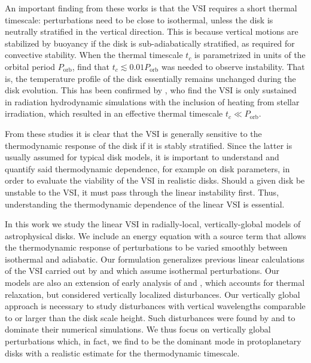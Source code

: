\documentclass[iop]{emulateapj}
\begin{document}
An important finding from these works is that the VSI requires a short
thermal timescale: perturbations need to be close to
isothermal, unless the disk is neutrally stratified in the vertical
direction. This is because vertical motions are stabilized by
buoyancy if the disk is sub-adiabatically stratified, as required for
convective stability. When the thermal timescale $t_c$ is parametrized
in units of the orbital period $P_\mathrm{orb}$, \cite{nelson13} find that
$t_c\lesssim 0.01P_\mathrm{orb}$ was needed to observe instability. That is, the
temperature profile of the disk essentially remains unchanged during
the disk evolution. This has been confirmed by 
\cite{stoll14}, who find the VSI is only sustained in radiation
hydrodynamic simulations with the inclusion of heating from stellar
irradiation, which resulted in an effective thermal timescale $t_c\ll
P_\mathrm{orb}$. 


From these studies it is clear that the VSI is generally sensitive to
the thermodynamic response of the disk if it is stably
stratified. Since the latter is usually assumed for typical disk
models,  
it is 
important to understand and quantify said thermodynamic dependence,
for example on disk parameters, in order to evaluate the viability of
the VSI in realistic disks. %
Should a given disk be unstable to the VSI, it must pass through the
linear instability first. Thus, understanding the thermodynamic dependence
of the linear VSI is essential. %

In this work we study the linear VSI in radially-local,
vertically-global models of astrophysical disks. We include an energy
equation with a source term that allows the thermodynamic response of
perturbations to be varied smoothly between isothermal and adiabatic. Our
formulation generalizes previous linear calculations of the 
VSI carried out by \cite{nelson13} and \cite{mcnally14} which assume
isothermal perturbations. Our models are also an extension of early
analysis of \cite{urpin98} and \cite{urpin03}, which accounts for thermal
relaxation, but considered vertically localized disturbances. Our
vertically global approach is necessary to study disturbances with
vertical wavelengths comparable to or larger than the disk scale
height. Such disturbances were  found by \cite{nelson13} and
\cite{stoll14} to dominate their numerical simulations.  We thus focus
on vertically global perturbations which, in fact, we find to be the
dominant mode in protoplanetary disks with a realistic estimate for
the thermodynamic timescale. 
\end{document}
